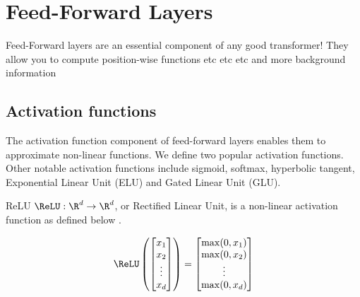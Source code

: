 %
\chapter{Feed-Forward Layers}
%



Feed-Forward layers are an essential component of any good transformer! They allow you to compute position-wise functions etc etc etc and more background information


\section{Activation functions}

The activation function component of feed-forward layers enables them to approximate non-linear functions. We define two popular activation functions. Other notable activation functions include sigmoid, softmax, hyperbolic tangent, Exponential Linear Unit (ELU) and Gated Linear Unit (GLU).

\begin{definition}{ReLU}{}
    $\ReLU : \R^d\to \R^d$, or Rectified Linear Unit, is a non-linear activation function as defined below \cite{Fukushima1975}.

    \[\ReLU\left(\begin{bmatrix}
                x_1    \\
                x_2    \\
                \vdots \\
                x_d    \\
            \end{bmatrix}\right) = \begin{bmatrix}
            \max(0,x_1) \\
            \max(0,x_2) \\
            \vdots      \\
            \max(0,x_d) \\
        \end{bmatrix}\]
\end{definition}

